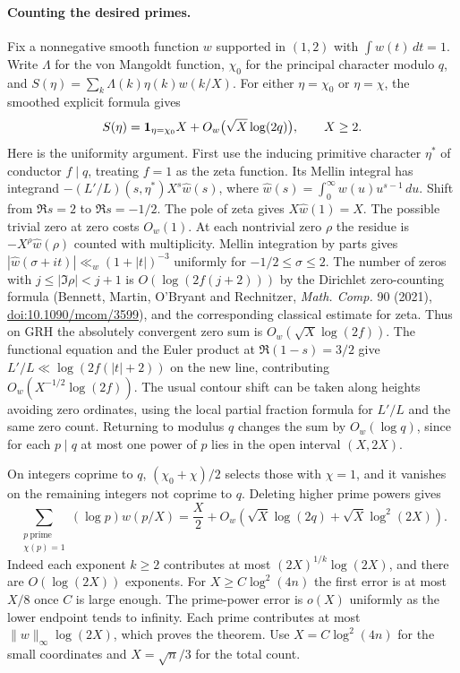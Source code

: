 \documentclass[11pt]{article}
\begin{document}
\paragraph{Counting the desired primes.}
Fix a nonnegative smooth function $w$ supported in $(1,2)$ with
$\int w(t)\,dt=1$. Write $\Lambda$ for the von Mangoldt function,
$\chi_0$ for the principal character modulo $q$, and
$S(\eta)=\sum_k\Lambda(k)\eta(k)w(k/X)$.
For either $\eta=\chi_0$ or $\eta=\chi$, the smoothed explicit formula gives
\[
 S(\eta)={\bf 1}_{\eta=\chi_0} X+
             O_w\bigl(\sqrt X\log(2q)\bigr),\qquad X\ge2.
\]
Here is the uniformity argument. First use the inducing primitive character
$\eta^*$ of conductor $f\mid q$, treating $f=1$ as the zeta function.
Its Mellin integral has integrand
$-(L'/L)(s,\eta^*)X^s\widehat w(s)$, where
$\widehat w(s)=\int_0^\infty w(u)u^{s-1}\,du$. Shift from $\Re s=2$
to $\Re s=-1/2$. The pole of zeta gives $X\widehat w(1)=X$.
The possible trivial zero at zero costs $O_w(1)$.
At each nontrivial zero $\rho$ the residue is
$-X^\rho\widehat w(\rho)$ counted with multiplicity.
Mellin integration by parts gives
$|\widehat w(\sigma+it)|\ll_w(1+|t|)^{-3}$
uniformly for $-1/2\le\sigma\le2$.
The number of zeros with $j\le |\Im\rho|<j+1$ is
$O(\log(2f(j+2)))$ by the Dirichlet zero-counting formula
(Bennett, Martin, O'Bryant and Rechnitzer, \emph{Math. Comp.} 90 (2021),
\href{https://doi.org/10.1090/mcom/3599}{doi:10.1090/mcom/3599}),
and the corresponding classical estimate for zeta. Thus on GRH the
absolutely convergent zero sum is $O_w(\sqrt X\log(2f))$.
The functional equation and the Euler product at $\Re(1-s)=3/2$ give
$L'/L\ll\log(2f(|t|+2))$ on the new line, contributing
$O_w(X^{-1/2}\log(2f))$. The usual contour shift can be taken along
heights avoiding zero ordinates, using the local partial fraction formula
for $L'/L$ and the same zero count. Returning to modulus $q$ changes
the sum by $O_w(\log q)$, since for each $p\mid q$ at most one power
of $p$ lies in the open interval $(X,2X)$.

On integers coprime to $q$, $(\chi_0+\chi)/2$ selects those with
$\chi=1$, and it vanishes on the remaining integers not coprime to $q$.
Deleting higher prime powers gives
\[
 \sum_{\substack{p\ \mathrm{prime}\\\chi(p)=1}}
             (\log p)w(p/X)
       =\frac X2+O_w\!\left(\sqrt X\log(2q)
                                  +\sqrt X\log^2(2X)\right).
\]
Indeed each exponent $k\ge2$ contributes at most
$(2X)^{1/k}\log(2X)$, and there are $O(\log(2X))$ exponents.
For $X\ge C\log^2(4n)$ the first error is at most $X/8$ once $C$ is
large enough. The prime-power error is $o(X)$ uniformly as the lower
endpoint tends to infinity. Each prime contributes at most
$\|w\|_\infty\log(2X)$, which proves the theorem.
Use $X=C\log^2(4n)$ for the small coordinates and $X=\sqrt n/3$
for the total count.
\end{document}
